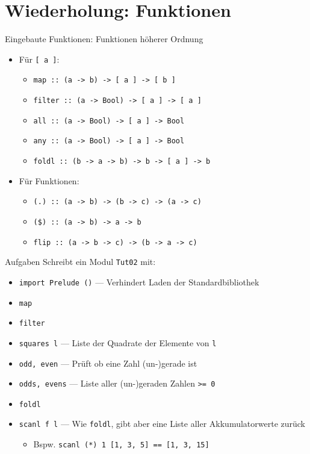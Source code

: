 \documentclass{beamer}
\begin{document}
\section{Wiederholung: Funktionen}

\begin{frame}{Eingebaute Funktionen: Funktionen höherer Ordnung}
	\begin{itemize}
		\item Für \texttt{[ a ]}:
		\begin{itemize}
			\item \texttt{map :: (a -> b) -> [ a ] -> [ b ]}
			\item \texttt{filter :: (a -> Bool) -> [ a ] -> [ a ]}
			\item \texttt{all :: (a -> Bool) -> [ a ] -> Bool}
			\item \texttt{any :: (a -> Bool) -> [ a ] -> Bool}
			\item \texttt{foldl :: (b -> a -> b) -> b -> [ a ] -> b}
		\end{itemize}
		\item Für Funktionen:
		\begin{itemize}
			\item \texttt{(.) :: (a -> b) -> (b -> c) -> (a -> c)}
			\item \texttt{(\$) :: (a -> b) -> a -> b}
			\item \texttt{flip :: (a -> b -> c) -> (b -> a -> c)}
		\end{itemize}
	\end{itemize}
\end{frame}

\begin{frame}{Aufgaben}
	Schreibt ein Modul \texttt{Tut02} mit:

	\begin{itemize}
		\item \texttt{import Prelude ()} --- Verhindert Laden der Standardbibliothek
		\item \texttt{map}
		\item \texttt{filter}
		\item \texttt{squares l} --- Liste der Quadrate der Elemente von \texttt{l}
		\item \texttt{odd, even} --- Prüft ob eine Zahl (un-)gerade ist
		\item \texttt{odds, evens} --- Liste aller (un-)geraden Zahlen \texttt{>= 0}
		\item \texttt{foldl}
		\item \texttt{scanl f l} --- Wie \texttt{foldl}, gibt aber eine Liste aller Akkumulatorwerte zurück
		\begin{itemize}
			\item Bspw. \texttt{scanl (*) 1 [1, 3, 5] == [1, 3, 15]}
		\end{itemize}
	\end{itemize}
\end{frame}
\end{document}
